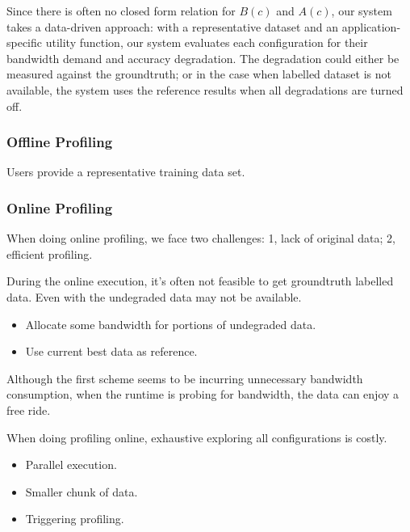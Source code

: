 Since there is often no closed form relation for $B(c)$ and $A(c)$, our system
takes a data-driven approach: with a representative dataset and an
application-specific utility function, our system evaluates each configuration
for their bandwidth demand and accuracy degradation. The degradation could
either be measured against the groundtruth; or in the case when labelled dataset
is not available, the system uses the reference results when all degradations
are turned off.

\subsubsection{Offline Profiling}
\label{sec:offline-profiling}

Users provide a representative training data set. 

\subsubsection{Online Profiling}
\label{sec:online-profiling}

When doing online profiling, we face two challenges: 1, lack of original data;
2, efficient profiling.

 During the online execution,
it's often not feasible to get groundtruth labelled data. Even with the
undegraded data may not be available.

\begin{itemize}[leftmargin=16pt]
\item Allocate some bandwidth for portions of undegraded data.
\item Use current best data as reference.
\end{itemize}

Although the first scheme seems to be incurring unnecessary bandwidth
consumption, when the runtime is probing for bandwidth, the data can enjoy a
free ride.

 When doing profiling online, exhaustive exploring
all configurations is costly.

\begin{itemize}[leftmargin=16pt]
\item Parallel execution.
\item Smaller chunk of data.
\item Triggering profiling.
\end{itemize}

